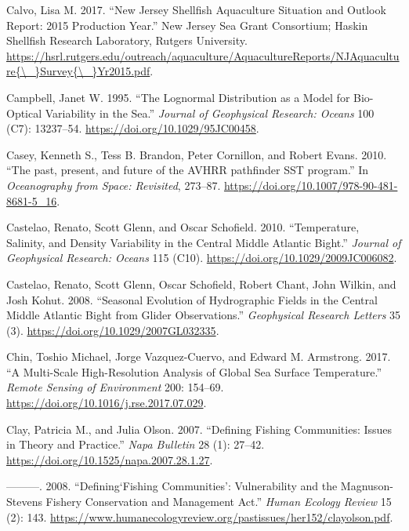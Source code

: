 \documentclass[
]{book}
\begin{document}
\leavevmode\hypertarget{ref-Calvo2017}{}%
Calvo, Lisa M. 2017. ``New Jersey Shellfish Aquaculture Situation and Outlook Report: 2015 Production Year.'' New Jersey Sea Grant Consortium; Haskin Shellfish Research Laboratory, Rutgers University. \href{https://hsrl.rutgers.edu/outreach/aquaculture/AquacultureReports/NJAquaculture\%7B/_\%7DSurvey\%7B/_\%7DYr2015.pdf}{https://hsrl.rutgers.edu/outreach/aquaculture/AquacultureReports/NJAquaculture\{\textbackslash{}\_\}Survey\{\textbackslash{}\_\}Yr2015.pdf}.

\leavevmode\hypertarget{ref-SOE2}{}%
Campbell, Janet W. 1995. ``The Lognormal Distribution as a Model for Bio-Optical Variability in the Sea.'' \emph{Journal of Geophysical Research: Oceans} 100 (C7): 13237--54. \url{https://doi.org/10.1029/95JC00458}.

\leavevmode\hypertarget{ref-Casey2010}{}%
Casey, Kenneth S., Tess B. Brandon, Peter Cornillon, and Robert Evans. 2010. ``The past, present, and future of the AVHRR pathfinder SST program.'' In \emph{Oceanography from Space: Revisited}, 273--87. \url{https://doi.org/10.1007/978-90-481-8681-5_16}.

\leavevmode\hypertarget{ref-castelao_temperature_2010}{}%
Castelao, Renato, Scott Glenn, and Oscar Schofield. 2010. ``Temperature, Salinity, and Density Variability in the Central Middle Atlantic Bight.'' \emph{Journal of Geophysical Research: Oceans} 115 (C10). \url{https://doi.org/10.1029/2009JC006082}.

\leavevmode\hypertarget{ref-castelao_seasonal_2008}{}%
Castelao, Renato, Scott Glenn, Oscar Schofield, Robert Chant, John Wilkin, and Josh Kohut. 2008. ``Seasonal Evolution of Hydrographic Fields in the Central Middle Atlantic Bight from Glider Observations.'' \emph{Geophysical Research Letters} 35 (3). \url{https://doi.org/10.1029/2007GL032335}.

\leavevmode\hypertarget{ref-SOE4}{}%
Chin, Toshio Michael, Jorge Vazquez-Cuervo, and Edward M. Armstrong. 2017. ``A Multi-Scale High-Resolution Analysis of Global Sea Surface Temperature.'' \emph{Remote Sensing of Environment} 200: 154--69. \url{https://doi.org/10.1016/j.rse.2017.07.029}.

\leavevmode\hypertarget{ref-clay_defining_2007}{}%
Clay, Patricia M., and Julia Olson. 2007. ``Defining Fishing Communities: Issues in Theory and Practice.'' \emph{Napa Bulletin} 28 (1): 27--42. \url{https://doi.org/10.1525/napa.2007.28.1.27}.

\leavevmode\hypertarget{ref-clay_definingfishing_2008}{}%
---------. 2008. ``Defining`Fishing Communities': Vulnerability and the Magnuson-Stevens Fishery Conservation and Management Act.'' \emph{Human Ecology Review} 15 (2): 143. \url{https://www.humanecologyreview.org/pastissues/her152/clayolson.pdf}.
\end{document}
